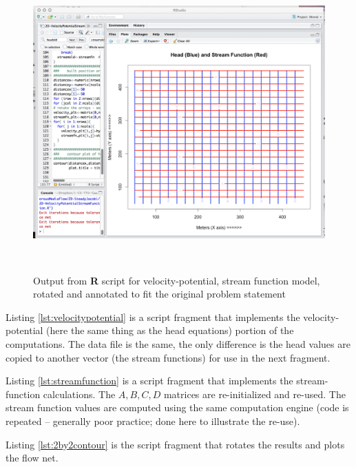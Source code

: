 \begin{figure}[h!] %
   \centering
   \includegraphics[height=4.5in]{./19-FlowNets/streamfn-2d-contour2.jpg} 
   \caption{Output from \textbf{R} script for velocity-potential, stream function model, rotated and annotated to fit the original problem statement}
   \label{fig:streamfn-2d-contour2}
\end{figure}

Listing \ref{lst:velocitypotential} is a script fragment that implements the velocity-potential (here the same thing as the head equations) portion of the computations.  
The data file is the same, the only difference is the head values are copied to another vector (the stream functions) for use in the next fragment.

Listing \ref{lst:streamfunction} is a script fragment that implements the stream-function calculations.  
The $A,B,C,D$ matrices are re-initialized and re-used.
The stream function values are computed using the same computation engine (code is repeated --  generally poor practice; done here to illustrate the re-use).

Listing \ref{lst:2by2contour} is the script fragment that rotates the results and plots the flow net.
\clearpage

